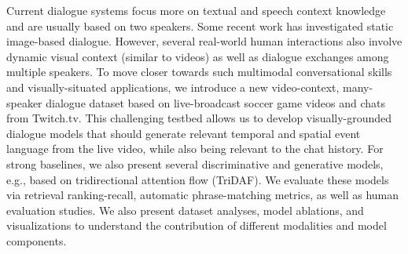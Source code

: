 Current dialogue systems focus more on textual and speech context knowledge and are usually based on two speakers. Some recent work has investigated static image-based dialogue. However, several real-world human interactions also involve dynamic visual context (similar to videos) as well as dialogue exchanges among multiple speakers. To move closer towards such multimodal conversational skills and visually-situated applications, we introduce a new video-context, many-speaker dialogue dataset based on live-broadcast soccer game videos and chats from Twitch.tv. This challenging testbed allows us to develop visually-grounded dialogue models that should generate relevant temporal and spatial event language from the live video, while also being relevant to the chat history. For strong baselines, we also present several discriminative and generative models, e.g., based on tridirectional attention flow (TriDAF). We evaluate these models via retrieval ranking-recall, automatic phrase-matching metrics, as well as human evaluation studies. We also present dataset analyses, model ablations, and visualizations to understand the contribution of different modalities and model components.
